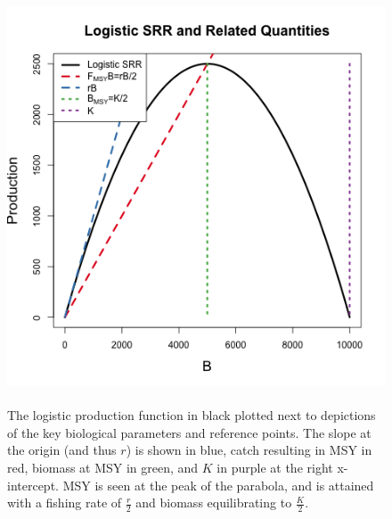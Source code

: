 \documentclass[12pt]{article}
\begin{document}
{%
\begin{figure}[h!]
\begin{minipage}[h!]{0.6\textwidth}
        \includegraphics[width=\textwidth]{./plots/srrSchaeffer.png}	
\end{minipage}
\begin{minipage}[h!]{0.37\textwidth}
\caption{\label{srrSchaefer}
	\\The logistic production function in black plotted next to depictions of the key biological parameters and reference points.
	The slope at the origin (and thus $r$) is shown in blue, catch resulting in MSY in red, biomass at MSY in green, and $K$ in purple at the right x-intercept.	
	MSY is seen at the peak of the parabola, and is attained with a fishing rate of $\frac{r}{2}$ and biomass equilibrating to $\frac{K}{2}$.
}
\end{minipage}
\end{figure}



}
\end{document}
